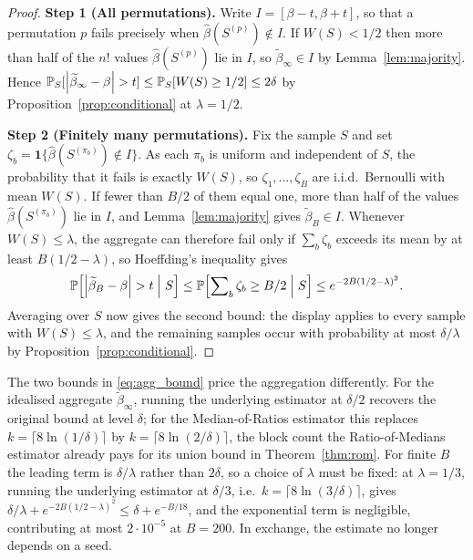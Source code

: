 \begin{proof}
    \noindent\textbf{Step 1 (All permutations).} Write $I = [\beta-t,\beta+t]$, so that a permutation $p$ fails precisely when $\hat{\beta}(S^{(p)}) \notin I$. If $W(S) < 1/2$ then more than half of the $n!$ values $\hat{\beta}(S^{(p)})$ lie in $I$, so $\widetilde{\beta}_\infty \in I$ by Lemma~\ref{lem:majority}. Hence $\operatorname{\mathbb{P}}_S[\left|\widetilde{\beta}_\infty-\beta\right| > t] \leq \operatorname{\mathbb{P}}_S[W(S) \geq 1/2] \leq 2\delta$ by Proposition~\ref{prop:conditional} at $\lambda = 1/2$.

    \medskip\noindent\textbf{Step 2 (Finitely many permutations).} Fix the sample $S$ and set $\zeta_b = \mathbf{1}\{\hat{\beta}(S^{(\pi_b)}) \notin I\}$. As each $\pi_b$ is uniform and independent of $S$, the probability that it fails is exactly $W(S)$, so $\zeta_1,\dots,\zeta_B$ are i.i.d.\ Bernoulli with mean $W(S)$. If fewer than $B/2$ of them equal one, more than half of the values $\hat{\beta}(S^{(\pi_b)})$ lie in $I$, and Lemma~\ref{lem:majority} gives $\widetilde{\beta}_B \in I$. Whenever $W(S) \leq \lambda$, the aggregate can therefore fail only if $\sum_b \zeta_b$ exceeds its mean by at least $B(1/2-\lambda)$, so Hoeffding's inequality gives
    \[
        \operatorname{\mathbb{P}}\!\left[\left|\widetilde{\beta}_B-\beta\right| > t \;\middle|\; S\right]
        \leq \operatorname{\mathbb{P}}\!\left[\sum\nolimits_{b} \zeta_b \geq B/2 \;\middle|\; S\right]
        \leq e^{-2B(1/2-\lambda)^2}.
    \]
    Averaging over $S$ now gives the second bound: the display applies to every sample with $W(S) \leq \lambda$, and the remaining samples occur with probability at most $\delta/\lambda$ by Proposition~\ref{prop:conditional}.
\end{proof}

\begin{remark}
\label{rem:agg_price}
    The two bounds in \eqref{eq:agg_bound} price the aggregation differently. For the idealised aggregate $\widetilde{\beta}_\infty$, running the underlying estimator at $\delta/2$ recovers the original bound at level $\delta$; for the Median-of-Ratios estimator this replaces $k = \lceil 8\ln(1/\delta)\rceil$ by $k = \lceil 8\ln(2/\delta)\rceil$, the block count the Ratio-of-Medians estimator already pays for its union bound in Theorem~\ref{thm:rom}. For finite $B$ the leading term is $\delta/\lambda$ rather than $2\delta$, so a choice of $\lambda$ must be fixed: at $\lambda = 1/3$, running the underlying estimator at $\delta/3$, i.e.\ $k = \lceil 8\ln(3/\delta)\rceil$, gives $\delta/\lambda + e^{-2B(1/2-\lambda)^2} \le \delta + e^{-B/18}$, and the exponential term is negligible, contributing at most $2\cdot 10^{-5}$ at $B = 200$. In exchange, the estimate no longer depends on a seed.
\end{remark}


